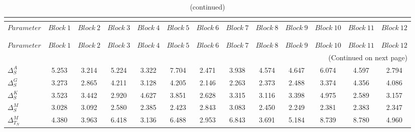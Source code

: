  
\begin{center}
\begin{longtable}{lcccccccccccc} 
\caption{MCMC Inefficiency factors per block}\\
 \label{Table:MCMC_inefficiency_factors}\\
\toprule 
$Parameter             $	 & 	 $     Block~1$	 & 	 $     Block~2$	 & 	 $     Block~3$	 & 	 $     Block~4$	 & 	 $     Block~5$	 & 	 $     Block~6$	 & 	 $     Block~7$	 & 	 $     Block~8$	 & 	 $     Block~9$	 & 	 $    Block~10$	 & 	 $    Block~11$	 & 	 $    Block~12$\\
\midrule \endfirsthead 
\caption{(continued)}\\
 \toprule \\ 
$Parameter             $	 & 	 $     Block~1$	 & 	 $     Block~2$	 & 	 $     Block~3$	 & 	 $     Block~4$	 & 	 $     Block~5$	 & 	 $     Block~6$	 & 	 $     Block~7$	 & 	 $     Block~8$	 & 	 $     Block~9$	 & 	 $    Block~10$	 & 	 $    Block~11$	 & 	 $    Block~12$\\
\midrule \endhead 
\midrule \multicolumn{13}{r}{(Continued on next page)} \\ \bottomrule \endfoot 
\bottomrule \endlastfoot 
$ {\Delta^{A}_{S}}     $	 & 	       5.253	 & 	       3.214	 & 	       5.224	 & 	       3.322	 & 	       7.704	 & 	       2.471	 & 	       3.938	 & 	       4.574	 & 	       4.647	 & 	       6.074	 & 	       4.597	 & 	       2.794 \\ 
$ {\Delta^{G}_{S}}     $	 & 	       3.273	 & 	       2.865	 & 	       4.211	 & 	       3.128	 & 	       4.205	 & 	       2.146	 & 	       2.263	 & 	       2.373	 & 	       2.488	 & 	       3.374	 & 	       4.356	 & 	       4.086 \\ 
$ {\Delta^{K}_{S}}     $	 & 	       3.523	 & 	       3.442	 & 	       2.920	 & 	       4.627	 & 	       3.851	 & 	       2.628	 & 	       3.315	 & 	       3.116	 & 	       3.398	 & 	       4.975	 & 	       2.589	 & 	       3.157 \\ 
$ {\Delta^{M}_{S}}     $	 & 	       3.028	 & 	       3.092	 & 	       2.580	 & 	       2.385	 & 	       2.423	 & 	       2.843	 & 	       3.083	 & 	       2.450	 & 	       2.249	 & 	       2.381	 & 	       2.383	 & 	       2.347 \\ 
$ {\Delta^{M}_{T_N}}   $	 & 	       4.380	 & 	       3.963	 & 	       6.418	 & 	       3.136	 & 	       6.488	 & 	       2.953	 & 	       6.843	 & 	       3.691	 & 	       5.184	 & 	       8.739	 & 	       8.780	 & 	       4.960 \\ 

\end{longtable}
\end{center}
